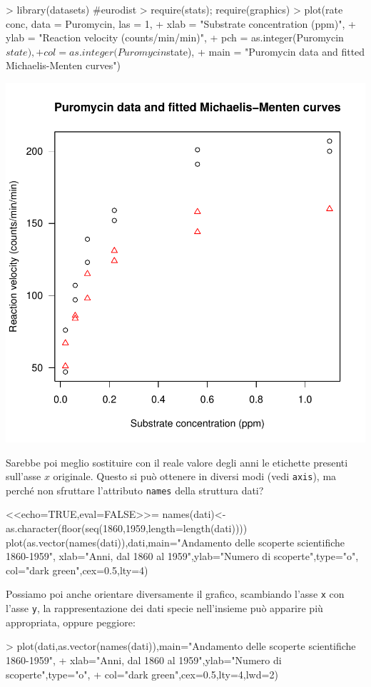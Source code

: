 \documentclass[onecolumn,11pt]{book}
\begin{document}
\begin{Schunk}
\begin{Sinput}
> library(datasets) #eurodist
> require(stats); require(graphics)
> plot(rate ~ conc, data = Puromycin, las = 1,
+ xlab = "Substrate concentration (ppm)",
+ ylab = "Reaction velocity (counts/min/min)",
+ pch = as.integer(Puromycin$state),
+ col = as.integer(Puromycin$state),
+ main = "Puromycin data and fitted Michaelis-Menten curves")
\end{Sinput}
\end{Schunk}
\includegraphics{statisticaconR-391}

Sarebbe poi meglio sostituire con il reale valore degli anni le etichette presenti sull'asse $x$ originale. Questo si pu\`o ottenere in diversi modi (vedi \texttt{axis}), ma perch\'e non sfruttare l'attributo \texttt{names} della struttura dati?

 <<echo=TRUE,eval=FALSE>>=
names(dati)<-as.character(floor(seq(1860,1959,length=length(dati))))
 plot(as.vector(names(dati)),dati,main="Andamento delle scoperte scientifiche 1860-1959",
xlab="Anni, dal 1860 al 1959",ylab="Numero di scoperte",type="o",
col="dark green",cex=0.5,lty=4)

Possiamo poi anche orientare diversamente il grafico, scambiando l'asse \texttt{x} con l'asse \texttt{y}, la
rappresentazione dei dati specie nell'insieme pu\`o apparire pi\`u appropriata, oppure peggiore:
\begin{Schunk}
\begin{Sinput}
> plot(dati,as.vector(names(dati)),main="Andamento delle scoperte scientifiche 1860-1959",
+ xlab="Anni, dal 1860 al 1959",ylab="Numero di scoperte",type="o",
+ col="dark green",cex=0.5,lty=4,lwd=2)
\end{Sinput}
\end{Schunk}
\end{document}
